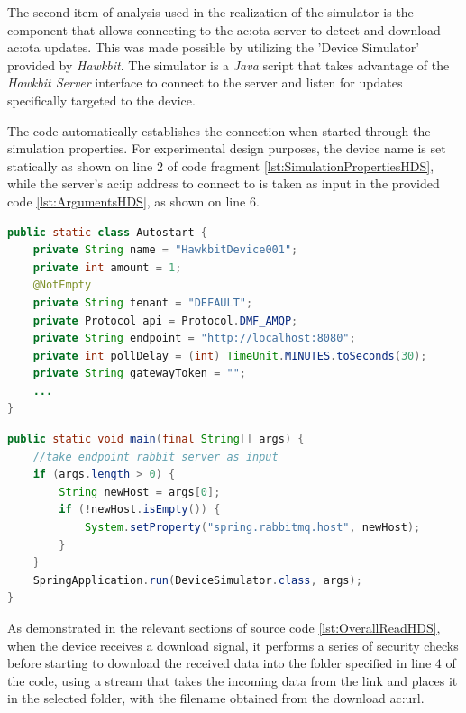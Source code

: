 The second item of analysis used in the realization of the simulator is the component that allows connecting to the \gls{ac:ota} server to detect and download \gls{ac:ota} updates. This was made possible by utilizing the 'Device Simulator' provided by \textit{Hawkbit}. The simulator is a \textit{Java} script that takes advantage of the \textit{Hawkbit Server} interface to connect to the server and listen for updates specifically targeted to the device.

The code automatically establishes the connection when started through the simulation properties. For experimental design purposes, the device name is set statically as shown on line 2 of code fragment \ref{lst:SimulationPropertiesHDS}, while the server's \gls{ac:ip} address to connect to is taken as input in the provided code \ref{lst:ArgumentsHDS}, as shown on line 6.

\begin{lstlisting}[language=Java, caption={Simulation properties of the \textit{Hawkbit Device Simulator}}, label=lst:SimulationPropertiesHDS]
public static class Autostart {
    private String name = "HawkbitDevice001";
    private int amount = 1;
    @NotEmpty
    private String tenant = "DEFAULT";
    private Protocol api = Protocol.DMF_AMQP;
    private String endpoint = "http://localhost:8080";
    private int pollDelay = (int) TimeUnit.MINUTES.toSeconds(30);
    private String gatewayToken = "";
    ...
}
\end{lstlisting}

\lstset{numbers=left}
\begin{lstlisting}[language=Java, caption={Input arguments to set the ip of the \gls{ac:ota} server to contact}, label=lst:ArgumentsHDS]
public static void main(final String[] args) {
    //take endpoint rabbit server as input
    if (args.length > 0) {
        String newHost = args[0];
        if (!newHost.isEmpty()) {
            System.setProperty("spring.rabbitmq.host", newHost);
        }
    }
    SpringApplication.run(DeviceSimulator.class, args);
}
\end{lstlisting}

As demonstrated in the relevant sections of source code \ref{lst:OverallReadHDS}, when the device receives a download signal, it performs a series of security checks before starting to download the received data into the folder specified in line 4 of the code, using a stream that takes the incoming data from the link and places it in the selected folder, with the filename obtained from the download \gls{ac:url}.

